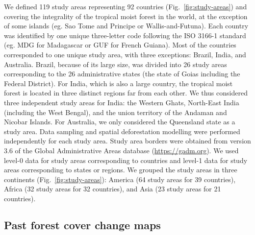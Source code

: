 \documentclass[
  12pt,
]{article}
\begin{document}
We defined 119 study areas representing 92 countries (Fig.~\ref{fig:study-areas}) and covering the integrality of the tropical moist forest in the world, at the exception of some islands (eg. Sao Tome and Principe or Wallis-and-Futuna). Each country was identified by one unique three-letter code following the ISO 3166-1 standard (eg. MDG for Madagascar or GUF for French Guiana). Most of the countries corresponded to one unique study area, with three exceptions: Brazil, India, and Australia. Brazil, because of its large size, was divided into 26 study areas corresponding to the 26 administrative states (the state of Goias including the Federal District). For India, which is also a large country, the tropical moist forest is located in three distinct regions far from each other. We thus considered three independent study areas for India: the Western Ghats, North-East India (including the West Bengal), and the union territory of the Andaman and Nicobar Islands. For Australia, we only considered the Queensland state as a study area. Data sampling and spatial deforestation modelling were performed independently for each study area. Study area borders were obtained from version 3.6 of the Global Administrative Areas database (\url{https://gadm.org}). We used level-0 data for study areas corresponding to countries and level-1 data for study areas corresponding to states or regions. We grouped the study areas in three continents (Fig.~\ref{fig:study-areas}): America (64 study areas for 39 countries), Africa (32 study areas for 32 countries), and Asia (23 study areas for 21 countries).

\hypertarget{past-forest-cover-change-maps}{%
\subsection{Past forest cover change maps}\label{past-forest-cover-change-maps}}
\end{document}
